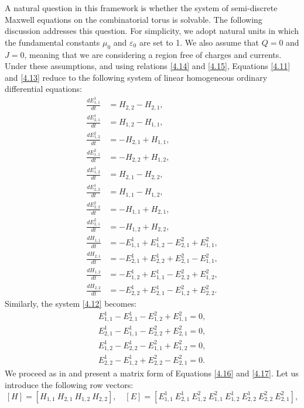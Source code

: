\documentclass[english]{article}
\theoremstyle{plain}
\theoremstyle{definition}
\theoremstyle{remark}
\numberwithin{equation}{section}
\begin{document}
A natural question in this framework is whether the system of semi-discrete Maxwell equations on the combinatorial torus is solvable. The following discussion addresses this question. For simplicity, we adopt natural units in which the fundamental constants $\mu_0$ and $\varepsilon_0$ are set to 1. We also assume that $Q = 0$ and $J = 0$, meaning that we are considering a region free of charges and currents.
Under these assumptions, and using relations \eqref{4.14} and \eqref{4.15}, Equations \eqref{4.11} and \eqref{4.13} reduce to the following system of linear homogeneous ordinary differential equations:
\begin{align}\label{4.16}
\frac{dE^1_{1,1}}{dt}&=H_{2,2}-H_{2,1}, \nonumber \\
 \frac{dE^1_{2,1}}{dt}&=H_{1,2}-H_{1,1}, \nonumber \\
\frac{dE^2_{1,2}}{dt}&=-H_{2,1}+H_{1,1}, \nonumber \\
\frac{dE^2_{1,1}}{dt}&=-H_{2,2}+H_{1,2}, \nonumber \\
\frac{dE^1_{1,2}}{dt}&=H_{2,1}-H_{2,2}, \nonumber \\
\frac{dE^1_{2,2}}{dt}&=H_{1,1}-H_{1,2}, \nonumber \\
\frac{dE^2_{2,2}}{dt}&=-H_{1,1}+H_{2,1}, \nonumber \\
\frac{dE^2_{2,1}}{dt}&=-H_{1,2}+H_{2,2}, \nonumber \\
\frac{dH_{1,1}}{dt}&=-E^1_{1,1}+E^1_{1,2}-E^2_{2,1}+E^2_{1,1}, \nonumber \\
\frac{dH_{2,1}}{dt}&=-E^1_{2,1}+E^1_{2,2}+E^2_{2,1}-E^2_{1,1}, \nonumber \\
\frac{dH_{1,2}}{dt}&=-E^1_{1,2}+E^1_{1,1}-E^2_{2,2}+E^2_{1,2}, \nonumber \\
\frac{dH_{2,2}}{dt}&=-E^1_{2,2}+E^1_{2,1}-E^2_{1,2}+E^2_{2,2}.
\end{align}
Similarly, the system \eqref{4.12} becomes:
\begin{align}\label{4.17}
E^1_{1,1}-E^1_{2,1}-E^2_{1,2}+E^2_{1,1}=0, \nonumber \\
 E^1_{2,1}-E^1_{1,1}-E^2_{2,2}+E^2_{2,1}=0, \nonumber \\
 E^1_{1,2}-E^1_{2,2}-E^2_{1,1}+E^2_{1,2}=0, \nonumber \\
 E^1_{2,2}-E^1_{1,2}+E^2_{2,2}-E^2_{2,1}=0.
\end{align}
We proceed as in \cite{S5} and present a matrix form of Equations \eqref{4.16} and \eqref{4.17}.
 Let us introduce the following row vectors:
\begin{equation*}\label{}
 [H]=[H_{1,1} \ H_{2,1} \ H_{1,2} \ H_{2,2}], \quad
 [E]=[E^1_{1,1} \ E^1_{2,1} \ E^2_{1,2} \ E^2_{1,1} \ E^1_{1,2} \ E^1_{2,2} \ E^2_{2,2} \ E^2_{2,1}],
 \end{equation*}
\end{document}

